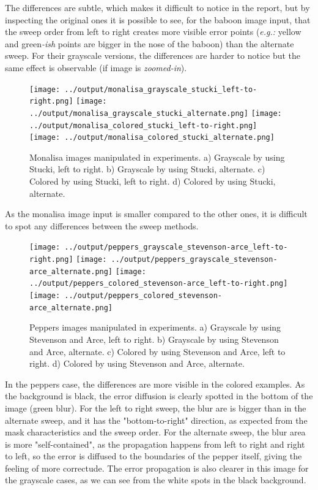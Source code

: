 \documentclass[]{IEEEtran}
\begin{document}
The differences are subtle, which makes it difficult to notice in the report, but by inspecting the original ones it is possible to see, for the baboon image input, that the sweep order from left to right creates more visible error points (\textit{e.g.: }yellow and green\textit{-ish} points are bigger in the nose of the baboon) than the alternate sweep. For their grayscale versions, the differences are harder to notice but the same effect is observable (if image is \textit{zoomed-in}).

\begin{figure}[H]
  \centering
  \texttt{[image: ../output/monalisa\_grayscale\_stucki\_left-to-right.png]}
  \texttt{[image: ../output/monalisa\_grayscale\_stucki\_alternate.png]}
  \texttt{[image: ../output/monalisa\_colored\_stucki\_left-to-right.png]}
  \texttt{[image: ../output/monalisa\_colored\_stucki\_alternate.png]}
  \caption{Monalisa images manipulated in experiments. a) Grayscale by using Stucki, left to right. b) Grayscale by using Stucki, alternate. c) Colored by using Stucki, left to right. d) Colored by using Stucki, alternate.}
  \label{fig:sweep-monalisa}
\end{figure}

As the monalisa image input is smaller compared to the other ones, it is difficult to spot any differences between the sweep methods.

\begin{figure}[H]
  \centering
  \texttt{[image: ../output/peppers\_grayscale\_stevenson-arce\_left-to-right.png]}
  \texttt{[image: ../output/peppers\_grayscale\_stevenson-arce\_alternate.png]}
  \texttt{[image: ../output/peppers\_colored\_stevenson-arce\_left-to-right.png]}
  \texttt{[image: ../output/peppers\_colored\_stevenson-arce\_alternate.png]}
  \caption{Peppers images manipulated in experiments. a) Grayscale by using Stevenson and Arce, left to right. b) Grayscale by using Stevenson and Arce, alternate. c) Colored by using Stevenson and Arce, left to right. d) Colored by using Stevenson and Arce, alternate.}
  \label{fig:sweep-peppers}
\end{figure}

In the peppers case, the differences are more visible in the colored examples. As the background is black, the error diffusion is clearly spotted in the bottom of the image (green blur). For the left to right sweep, the blur are is bigger than in the alternate sweep, and it has the "bottom-to-right" direction, as expected from the mask characteristics and the sweep order. For the alternate sweep, the blur area is more "self-contained", as the propagation happens from left to right and right to left, so the error is diffused to the boundaries of the pepper itself, giving the feeling of more correctude. The error propagation is also clearer in this image for the grayscale cases, as we can see from the white spots in the black background.
\end{document}
